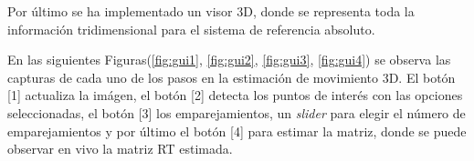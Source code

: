 Por último se ha implementado un visor 3D, donde se representa toda la información tridimensional para el sistema de referencia absoluto.

En las siguientes Figuras(\ref{fig:gui1}, \ref{fig:gui2}, \ref{fig:gui3}, \ref{fig:gui4}) se observa las capturas de cada uno de los pasos en la estimación de movimiento 3D. El botón [1] actualiza la imágen, el botón [2] detecta los puntos de interés con las opciones seleccionadas, el botón [3] los emparejamientos, un \textit{slider} para elegir el número de emparejamientos y por último el botón [4] para estimar la matriz, donde se puede observar en vivo la matriz RT estimada.

%
%
%
%
%

